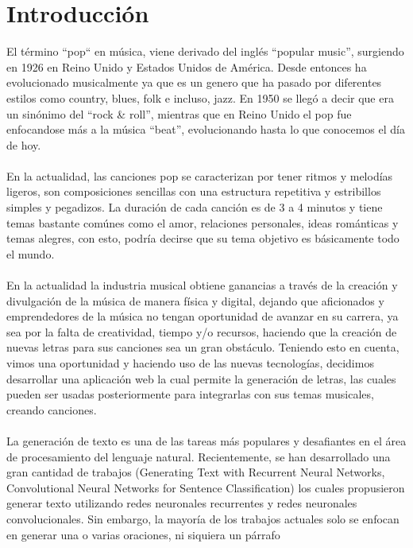 \section{Introducción}
  El término ``pop`` en música, viene derivado del inglés ``popular music'',
  surgiendo en 1926 en Reino Unido y Estados Unidos de América. Desde entonces ha evolucionado
  musicalmente ya que es un genero que ha pasado por diferentes estilos como country, blues, folk
  e incluso, jazz. En 1950 se llegó a decir que era un sinónimo del ``rock \& roll'', mientras que en
  Reino Unido el pop fue enfocandose más a la música ``beat'', evolucionando hasta lo que conocemos
  el día de hoy.\\\\
  En la actualidad, las canciones pop se caracterizan por tener ritmos y melodías ligeros,
  son composiciones sencillas con una estructura repetitiva y estribillos simples y pegadizos.
  La duración de cada canción es de 3 a 4 minutos y tiene temas bastante comúnes como el amor,
  relaciones personales, ideas románticas y temas alegres, con esto, podría decirse
  que su tema objetivo es básicamente todo el mundo.\cite{Brevepop}\\\\
  En la actualidad la industria musical obtiene ganancias a través
  de la creación y divulgación de la música de manera física y digital\cite{actmusica},
  dejando que aficionados y emprendedores de la música no tengan oportunidad
  de avanzar en su carrera, ya sea por la falta de creatividad, tiempo y/o recursos,
  haciendo que la creación de nuevas letras para sus canciones sea un gran obstáculo.
  Teniendo esto en cuenta, vimos una oportunidad y haciendo uso de las nuevas tecnologías,
  decidimos desarrollar una aplicación web la cual permite la generación de letras,
  las cuales pueden ser usadas posteriormente para integrarlas con sus temas musicales,
  creando canciones.\\\\
  La generación de texto es una de las tareas más populares y desafiantes en el área de
  procesamiento del lenguaje natural. Recientemente, se han desarrollado una gran cantidad
  de trabajos (Generating Text with Recurrent Neural Networks, Convolutional Neural Networks
  for Sentence Classification\cite{refneuralclass}) los cuales propusieron generar texto utilizando redes
  neuronales recurrentes y redes neuronales convolucionales. Sin embargo, la mayoría de los
  trabajos actuales solo se enfocan en generar una o varias oraciones, ni siquiera un párrafo
